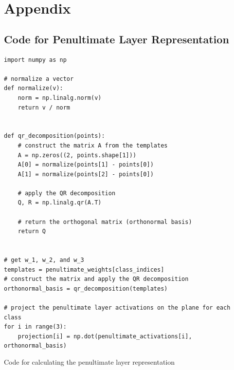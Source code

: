 \appendix
\section{Appendix}
\subsection{Code for Penultimate Layer Representation} \label{sec:app_pen}
\begin{algorithm}[ht]
\vspace{0.2em}\scriptsize
\begin{verbatim}
import numpy as np

# normalize a vector
def normalize(v):
    norm = np.linalg.norm(v)
    return v / norm


def qr_decomposition(points):
    # construct the matrix A from the templates
    A = np.zeros((2, points.shape[1]))
    A[0] = normalize(points[1] - points[0])
    A[1] = normalize(points[2] - points[0])

    # apply the QR decomposition
    Q, R = np.linalg.qr(A.T)

    # return the orthogonal matrix (orthonormal basis)
    return Q


# get w_1, w_2, and w_3
templates = penultimate_weights[class_indices]
# construct the matrix and apply the QR decomposition
orthonormal_basis = qr_decomposition(templates)

# project the penultimate layer activations on the plane for each class
for i in range(3):
    projection[i] = np.dot(penultimate_activations[i], orthonormal_basis)
\end{verbatim}
\vspace{-0.5em}
\caption{Code for calculating the penultimate layer representation}
\end{algorithm}
